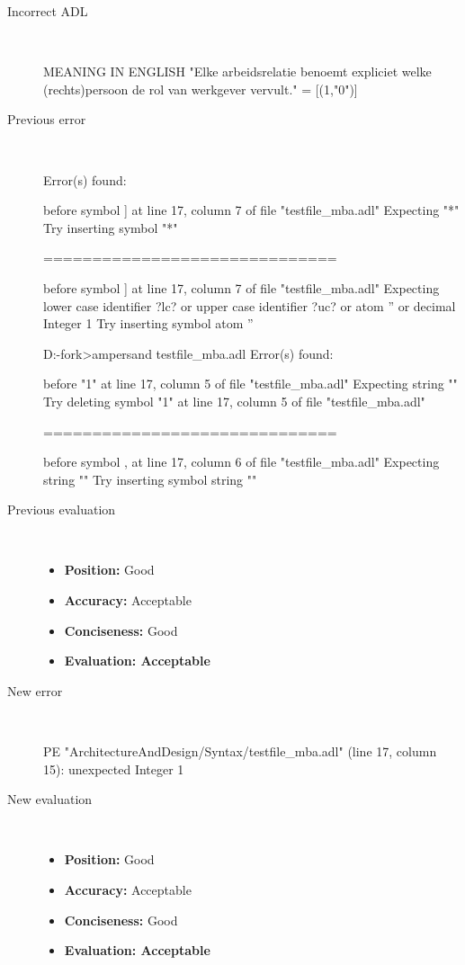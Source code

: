 \hrulefill

\begin{description}
  \item[Incorrect ADL]~\\
\begin{adl}
MEANING IN ENGLISH "Elke arbeidsrelatie benoemt expliciet welke (rechts)persoon de rol van werkgever vervult."
= [(1,"0")]\end{adl}
  \item[Previous error]~\\
\begin{haskell}
Error(s) found:

before symbol ] at line 17, column 7 of file "testfile_mba.adl"
Expecting "*"
Try inserting symbol "*"

==============================

before symbol ] at line 17, column 7 of file "testfile_mba.adl"
Expecting lower case identifier ?lc? or upper case identifier ?uc? or atom '' or
 decimal Integer 1
Try inserting symbol atom ''


D:\ampersand-fork\ArchitectureAndDesign\Syntax>ampersand testfile_mba.adl
Error(s) found:

before "1" at line 17, column 5 of file "testfile_mba.adl"
Expecting string ""
Try deleting symbol "1" at line 17, column 5 of file "testfile_mba.adl"

==============================

before symbol , at line 17, column 6 of file "testfile_mba.adl"
Expecting string ""
Try inserting symbol string ""
\end{haskell}
  \item[Previous evaluation]~\\
    \begin{itemize}
    \item \textbf{Position:} Good
    \item \textbf{Accuracy:} Acceptable
    \item \textbf{Conciseness:} Good
    \item \textbf{Evaluation: Acceptable}
    \end{itemize}
  \item[New error]~\\
\begin{haskell}
PE "ArchitectureAndDesign/Syntax/testfile_mba.adl" (line 17, column 15):
unexpected Integer 1\end{haskell}
  \item[New evaluation]~\\
    \begin{itemize}
    \item \textbf{Position:} Good
    \item \textbf{Accuracy:} Acceptable
    \item \textbf{Conciseness:} Good
    \item \textbf{Evaluation: Acceptable}
    \end{itemize}
  \end{description}

